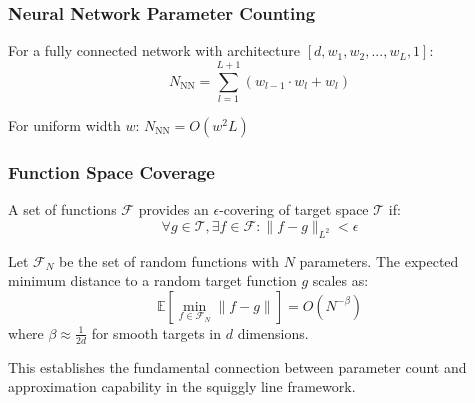 \subsubsection{Neural Network Parameter Counting}

For a fully connected network with architecture $[d, w_1, w_2, ..., w_L, 1]$:
$$N_{\text{NN}} = \sum_{l=1}^{L+1} (w_{l-1} \cdot w_l + w_l)$$

For uniform width $w$: $N_{\text{NN}} = O(w^2L)$

\subsubsection{Function Space Coverage}

\begin{definition}
A set of functions $\mathcal{F}$ provides an $\epsilon$-covering of target space $\mathcal{T}$ if:
$$\forall g \in \mathcal{T}, \exists f \in \mathcal{F} : \|f - g\|_{L^2} < \epsilon$$
\end{definition}

\begin{theorem}
Let $\mathcal{F}_N$ be the set of random functions with $N$ parameters. The expected minimum distance to a random target function $g$ scales as:
$$\mathbb{E}[\min_{f \in \mathcal{F}_N} \|f - g\|] = O(N^{-\beta})$$
where $\beta \approx \frac{1}{2d}$ for smooth targets in $d$ dimensions.
\end{theorem}

This establishes the fundamental connection between parameter count and approximation capability in the squiggly line framework.